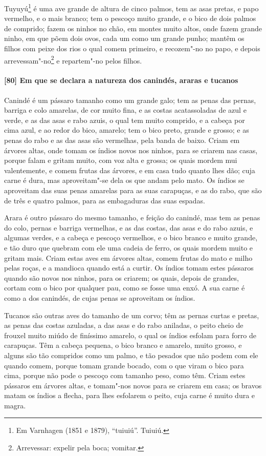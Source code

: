 \begin{linenumbers}
Tuyuyú\footnote{ Em Varnhagen (1851 e 1879), ``tuiuiú''. Tuiuiú.} é uma ave grande de
altura de cinco palmos, tem as asas pretas, e papo vermelho, e o mais branco; tem o
pescoço muito grande, e o bico de dois palmos de comprido; fazem os ninhos no chão, em
montes muito altos, onde fazem grande ninho, em que põem dois ovos, cada um como um grande
punho; mantêm os filhos com peixe dos rios o qual comem primeiro, e recozem"-no no papo, e
depois arrevessam"-no\footnote{ Arrevessar: expelir pela boca; vomitar.} e repartem"-no
pelos filhos.

\paragraph{[80] Em que se declara a natureza dos canindés, araras e tucanos}\quad
Canindé é um pássaro tamanho como um grande galo; tem as penas das pernas, barriga e colo
amarelas, de cor muito fina, e as costas acatassoladas de azul e verde, e as das asas e
rabo azuis, o qual tem muito comprido, e a cabeça por cima azul, e ao redor do bico,
amarelo; tem o bico preto, grande e grosso; e as penas do rabo e as das asas são
vermelhas, pela banda de baixo. Criam em árvores altas, onde tomam os índios novos nos
ninhos, para se criarem nas casas, porque falam e gritam muito, com voz alta e grossa; os
quais mordem mui valentemente, e comem frutas das árvores, e em casa tudo quanto lhes dão;
cuja carne é dura, mas aproveitam"-se dela os que andam pelo mato. Os índios se aproveitam
das suas penas amarelas para as suas carapuças, e as do rabo, que são de três e quatro
palmos, para as embagaduras das suas espadas.

Arara é outro pássaro do mesmo tamanho, e feição do canindé, mas tem as penas do colo,
pernas e barriga vermelhas, e as das costas, das asas e do rabo azuis, e algumas verdes, e
a cabeça e pescoço vermelhos, e o bico branco e muito grande, e tão duro que quebram com
ele uma cadeia de ferro, os quais mordem muito e gritam mais. Criam estas aves em árvores
altas, comem frutas do mato e milho pelas roças, e a mandioca quando está a curtir. Os
índios tomam estes pássaros quando são novos nos ninhos, para os criarem; os quais, depois
de grandes, cortam com o bico por qualquer pau, como se fosse uma enxó. A sua carne é como
a dos canindés, de cujas penas se aproveitam os índios.

Tucanos são outras aves do tamanho de um corvo; têm as pernas curtas e pretas, as penas
das costas azuladas, a das asas e do rabo aniladas, o peito cheio de frouxel muito miúdo
de finíssimo amarelo, o qual os índios esfolam para forro de carapuças. Têm a cabeça
pequena, o bico branco e amarelo, muito grosso, e alguns são tão compridos como um palmo,
e tão pesados que não podem com ele quando comem, porque tomam grande bocado, com o que
viram o bico para cima, porque não pode o pescoço com tamanho peso, como têm. Criam estes
pássaros em árvores altas, e tomam"-nos novos para se criarem em casa; os bravos matam os
índios a flecha, para lhes esfolarem o peito, cuja carne é muito dura e magra.


\end{linenumbers}
